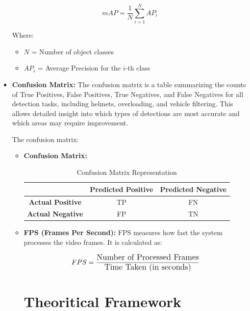 \begin{refsection}
\begin{itemize}
    \begin{equation}
        mAP = \frac{1}{N} \sum_{i=1}^{N} AP_i
        \label{eq:map}
    \end{equation}


    Where:
    \begin{itemize}
        \item $N$ = Number of object classes
        \item $AP_i$ = Average Precision for the $i$-th class
    \end{itemize}


    \item \textbf{Confusion Matrix:}  The confusion matrix is a table summarizing the counts of True Positives, False Positives, True Negatives, and False Negatives for all detection tasks, including helmets, overloading, and vehicle filtering. This allows detailed insight into which types of detections are most accurate and which areas may require improvement.


The confusion matrix:


\begin{itemize}
    \item \textbf{Confusion Matrix:}


    \begin{table}[ht]
    \centering
    \caption{Confusion Matrix Representation}
    \label{tbl:confusionMatrix}
    \begin{tabular}{|c|c|c|}
        \hline
        & \textbf{Predicted Positive} & \textbf{Predicted Negative} \\ \hline
        \textbf{Actual Positive} & TP & FN \\ \hline
        \textbf{Actual Negative} & FP & TN \\ \hline
    \end{tabular}
    \end{table}


    \item \textbf{FPS (Frames Per Second):} FPS measures how fast the system processes the video frames. It is calculated as:

\begin{equation}
    \large FPS = \frac{\text{Number of Processed Frames}}{\text{Time Taken (in seconds)}}
    \label{eq:fps}
\end{equation}


\section*{Theoritical Framework}



\end{itemize}
\end{itemize}
\end{refsection}

